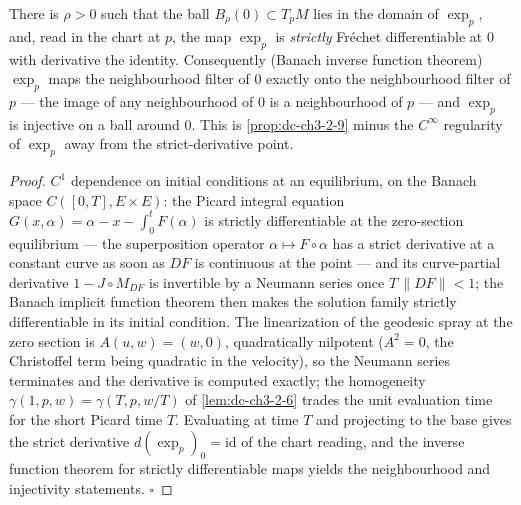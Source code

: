 \begin{lemma}
  \label{lem:dc-ch3-2-9-strict}
  \leanok
  There is $\rho > 0$ such that the ball $B_\rho(0) \subset T_pM$ lies in the
  domain of $\exp_p$, and, read in the chart at $p$, the map $\exp_p$ is
  \emph{strictly} Fréchet differentiable at $0$ with derivative the identity.
  Consequently (Banach inverse function theorem) $\exp_p$ maps the
  neighbourhood filter of $0$ exactly onto the neighbourhood filter of $p$ —
  the image of any neighbourhood of $0$ is a neighbourhood of $p$ — and
  $\exp_p$ is injective on a ball around $0$. This is
  \cref{prop:dc-ch3-2-9} minus the $C^\infty$ regularity of $\exp_p$ away from
  the strict-derivative point.
\end{lemma}
\begin{proof}
  \leanok
  $C^1$ dependence on initial conditions at an equilibrium, on the Banach
  space $C([0,T], E \times E)$: the Picard integral equation
  $G(x, \alpha) = \alpha - x - \int_0^t F(\alpha)$ is strictly differentiable
  at the zero-section equilibrium — the superposition operator
  $\alpha \mapsto F \circ \alpha$ has a strict derivative at a constant curve
  as soon as $DF$ is continuous at the point — and its curve-partial
  derivative $1 - J \circ M_{DF}$ is invertible by a Neumann series once
  $T\,\|DF\| < 1$; the Banach implicit function theorem then makes the
  solution family strictly differentiable in its initial condition. The
  linearization of the geodesic spray at the zero section is
  $A(u, w) = (w, 0)$, quadratically nilpotent ($A^2 = 0$, the Christoffel term
  being quadratic in the velocity), so the Neumann series terminates and the
  derivative is computed exactly; the homogeneity
  $\gamma(1, p, w) = \gamma(T, p, w/T)$ of \cref{lem:dc-ch3-2-6} trades the
  unit evaluation time for the short Picard time $T$. Evaluating at time $T$
  and projecting to the base gives the strict derivative
  $d(\exp_p)_0 = \mathrm{id}$ of the chart reading, and the inverse function
  theorem for strictly differentiable maps yields the neighbourhood and
  injectivity statements. $\square$
\end{proof}

